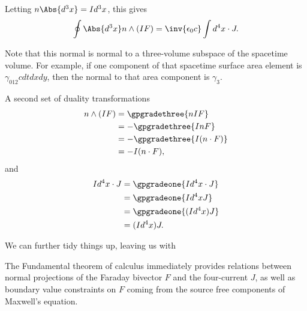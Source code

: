 {Letting \( n \Abs{d^3 x} = I d^3 x \), this gives
\begin{equation}\label{eqn:fundamentalTheoremOfCalculus:420}
\oint \Abs{d^3 x} n \wedge (I F) = \inv{\epsilon_0 c} \int d^4 x \cdot J.
\end{equation}

Note that this normal is normal to a three-volume subspace of the spacetime volume.  For example, if one component of that spacetime surface area element is \( \gamma_{012} c dt dx dy \), then the normal to that area component is \( \gamma_3 \).

A second set of duality transformations
\begin{equation}\label{eqn:fundamentalTheoremOfCalculus:440}
\begin{aligned}
n \wedge (IF)
&=
\gpgradethree{ n I F} \\
&=
-\gpgradethree{ I n F} \\
&=
-\gpgradethree{ I (n \cdot F)} \\
&=
-I (n \cdot F),
\end{aligned}
\end{equation}
and
\begin{equation}\label{eqn:fundamentalTheoremOfCalculus:460}
\begin{aligned}
I d^4 x \cdot J
&=
\gpgradeone{ I d^4 x \cdot J } \\
&=
\gpgradeone{ I d^4 x J } \\
&=
\gpgradeone{ (I d^4 x) J } \\
&=
(I d^4 x) J.
\end{aligned}
\end{equation}

We can further tidy things up, leaving us with

The Fundamental theorem of calculus immediately provides relations between normal projections of the Faraday bivector \( F \) and the four-current \( J \), as well as boundary value constraints on \( F \) coming from the source free components of Maxwell's equation.
} %
